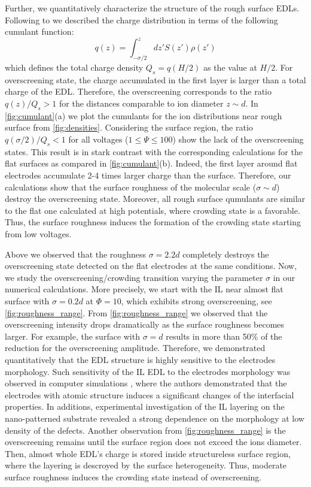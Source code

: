 Further, we quantitatively characterize the structure of the rough surface EDLs. Following to \cite{bazant2011double,de2020interfacial} we described the charge distribution in terms of the following cumulant function:
\begin{equation}
    \label{eq:cumulant}
    q(z)=\int_{-\sigma/2}^z dz'S(z')\rho(z')
\end{equation}
which defines the total charge density $Q_s=q(H/2)$ as the value at $H/2$. 
For overscreening state, the charge accumulated in the first layer is larger than a total charge of the EDL.
Therefore, the overscreening corresponds to the ratio $q(z)/Q_s>1$ for the distances comparable to ion diameter $z\sim d$. 
In \cref{fig:cumulant}(a) we plot the cumulants for the ion distributions near rough surface from \cref{fig:densities}. Considering the surface region, the ratio $q(\sigma/2)/Q_s<1$ for all voltages ($1\le\Psi\leq 100$) show the lack of the overscreening states. This result is in stark contrast with the corresponding calculations for the flat surfaces as compared in \cref{fig:cumulant}(b). Indeed, the first layer around flat electrodes accumulate 2-4 times larger charge than the surface.  Therefore, our calculations show that the surface roughness of the molecular scale ($\sigma\sim d$) destroy the overscreening state.  Moreover, all rough surface qumulants are similar to the flat one calculated at high potentials, where crowding state is a favorable. Thus, the surface roughness induces the formation of the crowding state starting from low voltages.

Above we observed that the roughness $\sigma=2.2d$ completely destroys the overscreening state detected on the flat electrodes at the same conditions. 
Now, we study the overscreening/crowding transition varying the parameter $\sigma$ in our numerical calculations. More precisely, we start with the IL near almost flat surface with $\sigma=0.2 d$ at $\Phi=10$, which exhibits strong overscreening, see \cref{fig:roughness_range}. From \cref{fig:roughness_range} we observed that the overscreening intensity drops dramatically as the surface roughness becomes larger. For example, the surface with $\sigma=d$ results in more than 50\% of the reduction for the overscreening amplitude. Therefore, we demonstrated quantitatively that the EDL structure is highly sensitive to the electrodes morphology. Such sensitivity of the IL EDL to the electrodes morphology was observed in computer simulations \cite{breitsprecher2015electrode}, where the authors demonstrated that the electrodes with atomic structure induces a significant changes of the interfacial properties. In additions, experimental investigation \cite{sheehan2016layering} of the IL layering on the nano-patterned substrate revealed a strong dependence on the morphology at low density of the defects. 
Another observation from \cref{fig:roughness_range} is the overscreening remains until the surface region does not exceed the ions diameter. Then, almost whole EDL's charge is stored inside structureless surface region, where the layering is descroyed by the surface heterogeneity.  
Thus, moderate surface roughness induces the crowding state instead of overscreening.

